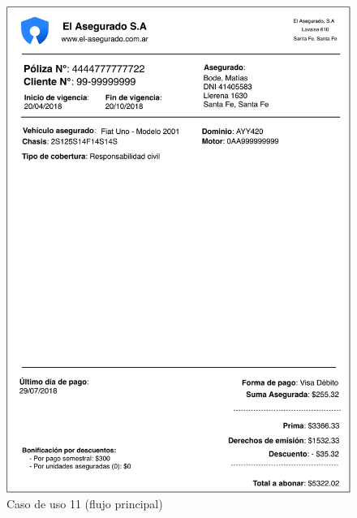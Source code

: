 \documentclass[12pt]{article}
\begin{document}
\vfill
\begin{figure}[h!]
\includegraphics[width=\textwidth]{CU11/CU-111.pdf}
\caption{Caso de uso 11 (flujo principal)}
\end{figure}
\vfill
\end{document}
